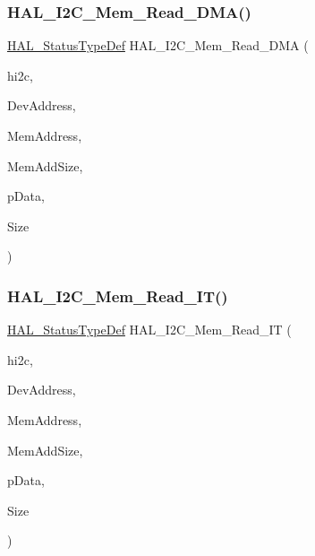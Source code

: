 \subsubsection{\texorpdfstring{H\+A\+L\+\_\+\+I2\+C\+\_\+\+Mem\+\_\+\+Read\+\_\+\+D\+M\+A()}{HAL\_I2C\_Mem\_Read\_DMA()}}
{\footnotesize\ttfamily \hyperlink{stm32f4xx__hal__def_8h_a63c0679d1cb8b8c684fbb0632743478f}{H\+A\+L\+\_\+\+Status\+Type\+Def} H\+A\+L\+\_\+\+I2\+C\+\_\+\+Mem\+\_\+\+Read\+\_\+\+D\+MA (\begin{DoxyParamCaption}\item[{\hyperlink{group___i2_c__handle___structure__definition_ga68e9f45c2fd2161fb827ccdeabb55ea5}{I2\+C\+\_\+\+Handle\+Type\+Def} $\ast$}]{hi2c,  }\item[{uint16\+\_\+t}]{Dev\+Address,  }\item[{uint16\+\_\+t}]{Mem\+Address,  }\item[{uint16\+\_\+t}]{Mem\+Add\+Size,  }\item[{uint8\+\_\+t $\ast$}]{p\+Data,  }\item[{uint16\+\_\+t}]{Size }\end{DoxyParamCaption})}

\mbox{\label{group___i2_c___exported___functions___group2_ga2274a9d894a1dc783bc647f937200f65}} 
\subsubsection{\texorpdfstring{H\+A\+L\+\_\+\+I2\+C\+\_\+\+Mem\+\_\+\+Read\+\_\+\+I\+T()}{HAL\_I2C\_Mem\_Read\_IT()}}
{\footnotesize\ttfamily \hyperlink{stm32f4xx__hal__def_8h_a63c0679d1cb8b8c684fbb0632743478f}{H\+A\+L\+\_\+\+Status\+Type\+Def} H\+A\+L\+\_\+\+I2\+C\+\_\+\+Mem\+\_\+\+Read\+\_\+\+IT (\begin{DoxyParamCaption}\item[{\hyperlink{group___i2_c__handle___structure__definition_ga68e9f45c2fd2161fb827ccdeabb55ea5}{I2\+C\+\_\+\+Handle\+Type\+Def} $\ast$}]{hi2c,  }\item[{uint16\+\_\+t}]{Dev\+Address,  }\item[{uint16\+\_\+t}]{Mem\+Address,  }\item[{uint16\+\_\+t}]{Mem\+Add\+Size,  }\item[{uint8\+\_\+t $\ast$}]{p\+Data,  }\item[{uint16\+\_\+t}]{Size }\end{DoxyParamCaption})}

